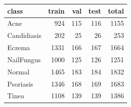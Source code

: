 \begin{tabular}{lrrrr}
\toprule
class & train & val & test & total \\
\midrule
Acne & 924 & 115 & 116 & 1155 \\
Candidiasis & 202 & 25 & 26 & 253 \\
Eczema & 1331 & 166 & 167 & 1664 \\
NailFungus & 1000 & 125 & 126 & 1251 \\
Normal & 1465 & 183 & 184 & 1832 \\
Psoriasis & 1346 & 168 & 169 & 1683 \\
Tinea & 1108 & 139 & 139 & 1386 \\
\bottomrule
\end{tabular}
